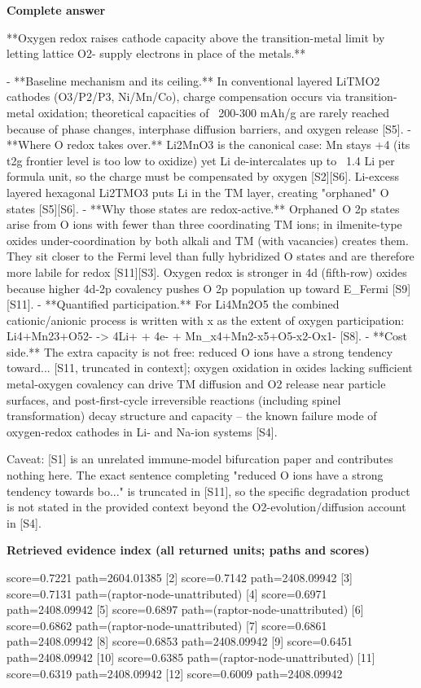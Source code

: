 \documentclass[10pt]{article}
\begin{document}
\textbf{Complete answer}
\begin{AnswerText}
**Oxygen redox raises cathode capacity above the transition-metal limit by letting lattice O2- supply electrons in place of the metals.**

- **Baseline mechanism and its ceiling.** In conventional layered LiTMO2 cathodes (O3/P2/P3, Ni/Mn/Co), charge compensation occurs via transition-metal oxidation; theoretical capacities of ~200-300 mAh/g are rarely reached because of phase changes, interphase diffusion barriers, and oxygen release [S5].
- **Where O redox takes over.** Li2MnO3 is the canonical case: Mn stays +4 (its t2g frontier level is too low to oxidize) yet Li de-intercalates up to ~1.4 Li per formula unit, so the charge must be compensated by oxygen [S2][S6]. Li-excess layered hexagonal Li2TMO3 puts Li in the TM layer, creating "orphaned" O states [S5][S6].
- **Why those states are redox-active.** Orphaned O 2p states arise from O ions with fewer than three coordinating TM ions; in ilmenite-type oxides under-coordination by both alkali and TM (with vacancies) creates them. They sit closer to the Fermi level than fully hybridized O states and are therefore more labile for redox [S11][S3]. Oxygen redox is stronger in 4d (fifth-row) oxides because higher 4d-2p covalency pushes O 2p population up toward E_Fermi [S9][S11].
- **Quantified participation.** For Li4Mn2O5 the combined cationic/anionic process is written with x as the extent of oxygen participation: Li4+Mn23+O52- -> 4Li+ + 4e- + Mn_x4+Mn2-x5+O5-x2-Ox1- [S8].
- **Cost side.** The extra capacity is not free: reduced O ions have a strong tendency toward... [S11, truncated in context]; oxygen oxidation in oxides lacking sufficient metal-oxygen covalency can drive TM diffusion and O2 release near particle surfaces, and post-first-cycle irreversible reactions (including spinel transformation) decay structure and capacity -- the known failure mode of oxygen-redox cathodes in Li- and Na-ion systems [S4].

Caveat: [S1] is an unrelated immune-model bifurcation paper and contributes nothing here. The exact sentence completing "reduced O ions have a strong tendency towards bo..." is truncated in [S11], so the specific degradation product is not stated in the provided context beyond the O2-evolution/diffusion account in [S4].
\end{AnswerText}

\textbf{Retrieved evidence index (all returned units; paths and scores) }
\begin{EvidenceText}
[1] score=0.7221 path=2604.01385
[2] score=0.7142 path=2408.09942
[3] score=0.7131 path=(raptor-node-unattributed)
[4] score=0.6971 path=2408.09942
[5] score=0.6897 path=(raptor-node-unattributed)
[6] score=0.6862 path=(raptor-node-unattributed)
[7] score=0.6861 path=2408.09942
[8] score=0.6853 path=2408.09942
[9] score=0.6451 path=2408.09942
[10] score=0.6385 path=(raptor-node-unattributed)
[11] score=0.6319 path=2408.09942
[12] score=0.6009 path=2408.09942
\end{EvidenceText}
\end{document}
